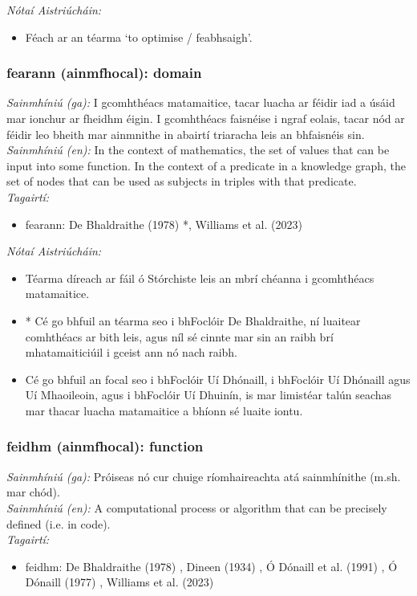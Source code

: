  \noindent \textit{Nótaí Aistriúcháin:}
\begin{itemize}
	\item Féach ar an téarma `to optimise / feabhsaigh'.
\end{itemize}


\subsubsection*{fearann (ainmfhocal): domain}
 \noindent \textit{Sainmhíniú (ga):} I gcomhthéacs matamaitice, tacar luacha ar féidir iad a úsáid mar ionchur ar fheidhm éigin. I gcomhthéacs faisnéise i ngraf eolais, tacar nód ar féidir leo bheith mar ainmnithe in abairtí triaracha leis an bhfaisnéis sin.
\\
 \noindent \textit{Sainmhíniú (en):} In the context of mathematics, the set of values that can be input into some function. In the context of a predicate in a knowledge graph, the set of nodes that can be used as subjects in triples with that predicate.
\\
 \noindent \textit{Tagairtí:}
\begin{itemize}
	\item fearann: De Bhaldraithe (1978) \cite{de-bhaldraithe}*, Williams et al. (2023) \cite{storchiste}
\end{itemize}

 \noindent \textit{Nótaí Aistriúcháin:}
\begin{itemize}
	\item Téarma díreach ar fáil ó Stórchiste leis an mbrí chéanna i gcomhthéacs matamaitice.
	\item * Cé go bhfuil an téarma seo i bhFoclóir De Bhaldraithe, ní luaitear comhthéacs ar bith leis, agus níl sé cinnte mar sin an raibh brí mhatamaiticiúil i gceist ann nó nach raibh.
	\item Cé go bhfuil an focal seo i bhFoclóir Uí Dhónaill, i bhFoclóir Uí Dhónaill agus Uí Mhaoileoin, agus i bhFoclóir Uí Dhuinín, is mar limistéar talún seachas mar thacar luacha matamaitice a bhíonn sé luaite iontu.
\end{itemize}


\subsubsection*{feidhm (ainmfhocal): function}
 \noindent \textit{Sainmhíniú (ga):} Próiseas nó cur chuige ríomhaireachta atá sainmhínithe (m.sh. mar chód).
\\
 \noindent \textit{Sainmhíniú (en):} A computational process or algorithm that can be precisely defined (i.e. in code).
\\
 \noindent \textit{Tagairtí:}
\begin{itemize}
	\item feidhm: De Bhaldraithe (1978) \cite{de-bhaldraithe}, Dineen (1934) \cite{dineen}, Ó Dónaill et al. (1991) \cite{focloir-beag}, Ó Dónaill (1977) \cite{odonaill}, Williams et al. (2023) \cite{storchiste}
\end{itemize}

